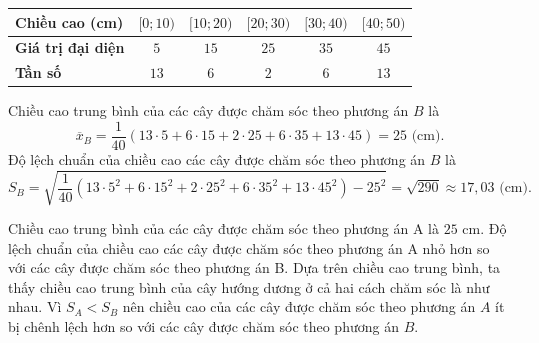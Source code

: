 \begin{ex}
{		\begin{center}
			\begin{tabular}{|l|c|c|c|c|c|}
				\hline
				\textbf{Chiều cao (cm)} & $[0; 10)$ & $ [10; 20)$ & $ [20; 30)$ & $ [30; 40)$ & $ [40; 50)$    \\
				\hline
				\textbf{Giá trị đại diện}&$5$ & $15$ & $25$ & $35$ & $45$  \\ \hline 
				\textbf{Tần số }&$ 13 $& $6$ & $2$ & $6$ & $13$ \\ 
				\hline
			\end{tabular}
		\end{center}
		Chiều cao trung bình của các cây được chăm sóc theo phương án $B$ là 
		$$\overline{x}_B = \dfrac{1}{40}\left(13\cdot 5 +  6\cdot 15 + 2\cdot 25 + 6\cdot 35 + 13\cdot 45\right) = 25 \textrm{ (cm)}.$$
		Độ lệch chuẩn của chiều cao các cây được chăm sóc theo phương án $B$ là 
		$$S_B = \sqrt{\dfrac{1}{40}\left(13\cdot 5^2 +  6\cdot 15^2 + 2\cdot 25^2 + 6\cdot 35^2 + 13\cdot 45^2 \right) - 25^2} = \sqrt{290} \approx 17{,}03 \textrm{ (cm)}. $$
		\begin{itemchoice}
			\itemch Chiều cao trung bình của các cây được chăm sóc theo phương án A là $25$ cm.
			\itemch Độ lệch chuẩn của chiều cao các cây được chăm sóc theo phương án A nhỏ hơn so với các cây được chăm sóc theo phương án B.
			\itemch Dựa trên chiều cao trung bình, ta thấy chiều cao trung bình của cây hướng dương ở cả hai cách chăm sóc là như nhau.
			\itemch Vì $S_A < S_B$ nên chiều cao của các cây được chăm sóc theo phương án $A$ ít bị chênh lệch hơn so với các cây được chăm sóc theo phương án $B$.
		\end{itemchoice}
	}
\end{ex}

